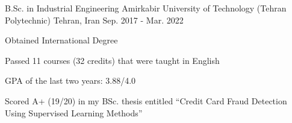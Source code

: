 

\begin{cventries}

  \cventry
    {B.Sc. in Industrial Engineering} %
    {Amirkabir University of Technology (Tehran Polytechnic)} %
    {Tehran, Iran} %
    {Sep. 2017 - Mar. 2022} %
    {
      \begin{cvitems} %
        \item {Obtained International Degree}
        \item {Passed 11 courses (32 credits) that were taught in English}
        \item {GPA of the last two years: 3.88/4.0}
        \item {Scored A+ (19/20) in my BSc. thesis entitled ``Credit Card Fraud Detection Using Supervised Learning Methods''}
      \end{cvitems}
    }

\end{cventries}
